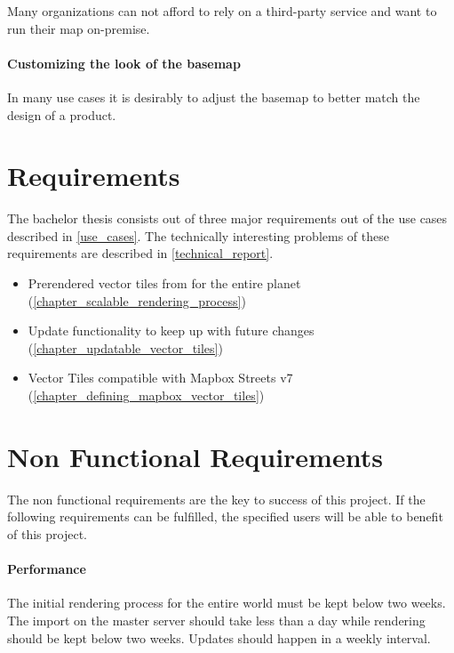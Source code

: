 Many organizations can not afford to rely on a third-party service and want to run their map on-premise.

\paragraph{Customizing the look of the basemap}

In many use cases it is desirably to adjust the basemap to better match the design of a product.

\section{Requirements}\label{requirements}

The bachelor thesis consists out of three major requirements out of the use cases described in \autoref{use_cases}. The technically interesting problems of these requirements are described in \autoref{technical_report}.

\begin{itemize}
    \item Prerendered vector tiles from \osm{} for the entire planet (\autoref{chapter_scalable_rendering_process})
    \item Update functionality to keep up with future \osm{} changes (\autoref{chapter_updatable_vector_tiles})
    \item Vector Tiles compatible with Mapbox Streets v7 (\autoref{chapter_defining_mapbox_vector_tiles})
\end{itemize}


\section{Non Functional Requirements}\label{non_functional_requirements}

The non functional requirements are the key to success of this project. If the following requirements can be fulfilled, the specified users will be able to benefit of this project.

\paragraph{Performance}

The initial rendering process for the entire world must be kept below two weeks. The import on the master server should take less than a day while rendering should be kept below two weeks.
Updates should happen in a weekly interval.

